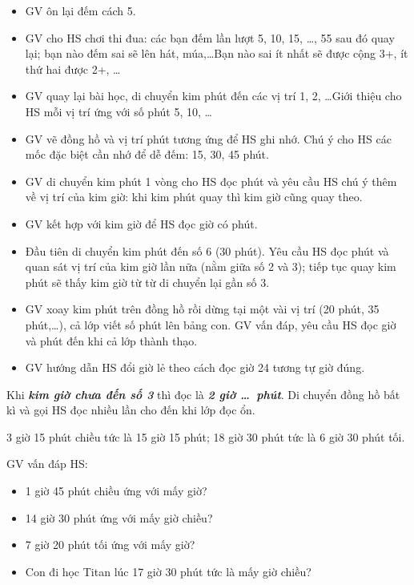 \documentclass[../main.tex]{subfiles}
\begin{document}
\begin{itemize}
    \item GV ôn lại đếm cách 5.
    \item GV cho HS chơi thi đua: các bạn đếm lần lượt 5, 10, 15, \dots, 55 sau đó quay lại; bạn nào đếm sai sẽ lên hát, múa,\dots Bạn nào sai ít nhất sẽ được cộng 3+, ít thứ hai được 2+, \dots
    \item GV quay lại bài học, di chuyển kim phút đến các vị trí 1, 2, \dots Giới thiệu cho HS mỗi vị trí ứng với số phút 5, 10, \dots
    \item GV vẽ đồng hồ và vị trí phút tương ứng để HS ghi nhớ. Chú ý cho HS các mốc đặc biệt cần nhớ để dễ đếm: 15, 30, 45 phút.
\end{itemize}
\GAdonghophut
{}
\begin{itemize}
    \item GV di chuyển kim phút 1 vòng cho HS đọc phút và yêu cầu HS chú ý thêm về vị trí của kim giờ: khi kim phút quay thì kim giờ cũng quay theo.
    \item GV kết hợp với kim giờ để HS đọc giờ có phút.
    \item Đầu tiên di chuyển kim phút đến số 6 (30 phút). Yêu cầu HS đọc phút và quan sát vị trí của kim giờ lần nữa (nằm giữa số 2 và 3); tiếp tục quay kim phút sẽ thấy kim giờ từ từ di chuyển lại gần số 3.
    \item GV xoay kim phút trên đồng hồ rồi dừng tại một vài vị trí (20 phút, 35 phút,\dots), cả lớp viết số phút lên bảng con. GV vấn đáp, yêu cầu HS đọc giờ và phút đến khi cả lớp thành thạo.
    \item GV hướng dẫn HS đổi giờ lẻ theo cách đọc giờ 24 tương tự giờ đúng.
\end{itemize}
\begin{luuy}
    Khi \textbf{\textit{kim giờ chưa đến số 3}} thì đọc là \textbf{\textit{2 giờ \dots\ phút}}. Di chuyển đồng hồ bất kì và gọi HS đọc nhiều lần cho đến khi lớp đọc ổn.
\end{luuy}
\begin{vd}
    3 giờ 15 phút chiều tức là 15 giờ 15 phút; 18 giờ 30 phút tức là 6 giờ 30 phút tối.
\end{vd}
\begin{vd}
    GV vấn đáp HS:
    \begin{itemize}
        \item 1 giờ 45 phút chiều ứng với mấy giờ?
        \item 14 giờ 30 phút ứng với mấy giờ chiều?
        \item 7 giờ 20 phút tối ứng với mấy giờ?
        \item Con đi học Titan lúc 17 giờ 30 phút tức là mấy giờ chiều?
    \end{itemize}
\end{vd}
\end{document}
